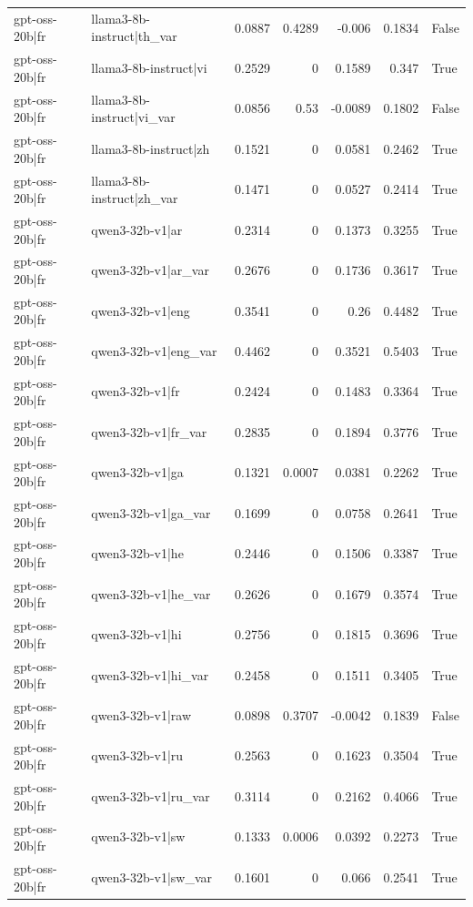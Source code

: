 \begin{table}
\begin{tabular}{l l r r r r l}
gpt-oss-20b|fr & llama3-8b-instruct|th_var & 0.0887 & 0.4289 & -0.006 & 0.1834 & False \\
gpt-oss-20b|fr & llama3-8b-instruct|vi & 0.2529 & 0 & 0.1589 & 0.347 & True \\
gpt-oss-20b|fr & llama3-8b-instruct|vi_var & 0.0856 & 0.53 & -0.0089 & 0.1802 & False \\
gpt-oss-20b|fr & llama3-8b-instruct|zh & 0.1521 & 0 & 0.0581 & 0.2462 & True \\
gpt-oss-20b|fr & llama3-8b-instruct|zh_var & 0.1471 & 0 & 0.0527 & 0.2414 & True \\
gpt-oss-20b|fr & qwen3-32b-v1|ar & 0.2314 & 0 & 0.1373 & 0.3255 & True \\
gpt-oss-20b|fr & qwen3-32b-v1|ar_var & 0.2676 & 0 & 0.1736 & 0.3617 & True \\
gpt-oss-20b|fr & qwen3-32b-v1|eng & 0.3541 & 0 & 0.26 & 0.4482 & True \\
gpt-oss-20b|fr & qwen3-32b-v1|eng_var & 0.4462 & 0 & 0.3521 & 0.5403 & True \\
gpt-oss-20b|fr & qwen3-32b-v1|fr & 0.2424 & 0 & 0.1483 & 0.3364 & True \\
gpt-oss-20b|fr & qwen3-32b-v1|fr_var & 0.2835 & 0 & 0.1894 & 0.3776 & True \\
gpt-oss-20b|fr & qwen3-32b-v1|ga & 0.1321 & 0.0007 & 0.0381 & 0.2262 & True \\
gpt-oss-20b|fr & qwen3-32b-v1|ga_var & 0.1699 & 0 & 0.0758 & 0.2641 & True \\
gpt-oss-20b|fr & qwen3-32b-v1|he & 0.2446 & 0 & 0.1506 & 0.3387 & True \\
gpt-oss-20b|fr & qwen3-32b-v1|he_var & 0.2626 & 0 & 0.1679 & 0.3574 & True \\
gpt-oss-20b|fr & qwen3-32b-v1|hi & 0.2756 & 0 & 0.1815 & 0.3696 & True \\
gpt-oss-20b|fr & qwen3-32b-v1|hi_var & 0.2458 & 0 & 0.1511 & 0.3405 & True \\
gpt-oss-20b|fr & qwen3-32b-v1|raw & 0.0898 & 0.3707 & -0.0042 & 0.1839 & False \\
gpt-oss-20b|fr & qwen3-32b-v1|ru & 0.2563 & 0 & 0.1623 & 0.3504 & True \\
gpt-oss-20b|fr & qwen3-32b-v1|ru_var & 0.3114 & 0 & 0.2162 & 0.4066 & True \\
gpt-oss-20b|fr & qwen3-32b-v1|sw & 0.1333 & 0.0006 & 0.0392 & 0.2273 & True \\
gpt-oss-20b|fr & qwen3-32b-v1|sw_var & 0.1601 & 0 & 0.066 & 0.2541 & True \\

\end{tabular}
\end{table}
